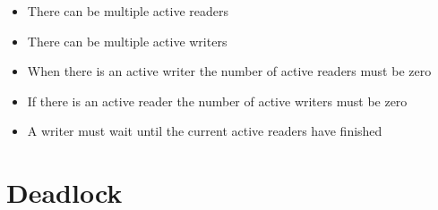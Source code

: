 \begin{enumerate}
\begin{itemize}
\tightlist
\item
  There can be multiple active readers
\item
  There can be multiple active writers
\item
  When there is an active writer the number of active readers must be zero
\item
  If there is an active reader the number of active writers must be zero
\item
  A writer must wait until the current active readers have finished
\end{itemize}

\end{enumerate}

\section{Deadlock}

